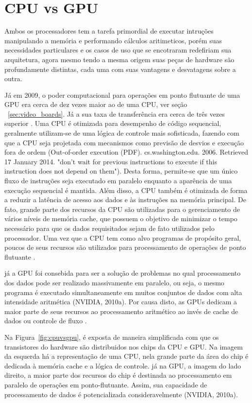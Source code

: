 \section{CPU vs GPU}

Ambos os processadores tem a tarefa primordial de executar intruções manipulando a memória e performando cálculos aritimeticos, porém suas necessidades particulares e os casos de uso que se encotraram redefiriam sua arquitetura, agora mesmo tendo a mesma origem suas peças de hardware são profundamente distintas, cada uma com suas vantagens e desvatagens sobre a outra.

Já em 2009, o poder computacional para operações em ponto flutuante de uma GPU era cerca de dez vezes maior ao de uma CPU, ver seção ~\ref{sec:video_boards}. Já a sua taxa de transferência era cerca de três vezes superior \citep{massively:16}. Uma CPU é otimizada para desempenho de código sequencial, geralmente utilizam-se de uma lógica de controle mais sofisticada, fazendo com que a CPU seja projetada com mecanismos como previsão de desvios e execução fora de ordem (Out-of-order execution (PDF). cs.washington.edu. 2006. Retrieved 17 January 2014. "don't wait for previous instructions to execute if this instruction does not depend on them"). Desta forma, permite-se que um único fluxo de instruções seja executado em paralelo enquanto a aparência de uma execução sequencial é mantida. Além disso, a CPU também é otimizada de forma a reduzir a latência de acesso aos dados e às instruções na memória principal. De fato, grande parte dos recursos da CPU são utilizadas para o gerenciamento de vários níveis de memória cache, que possuem o objetivo de minimizar o tempo necessário para que os dados requisitados sejam de fato utilizados pelo processador. Uma vez que a CPU tem como alvo programas de propósito geral, poucos de seus recursos são utilizados para processamento de operações de ponto flutuante \citep{massively:16}.

já a GPU foi consebida para ser a solução de problemas no qual processamento dos dados pode ser realizado massivamente em paralelo, ou seja, o mesmo programa é executado simultaneamente em muitos conjuntos de dados com alta intensidade aritmética (NVIDIA, 2010a). Por causa disto, as GPUs dedicam a maior parte de seus recursos ao processamento aritmético ao invés de cache de dados ou controle de fluxo \citep{massively:16}.

Na Figura~\ref{fig:cpuvsgpu}, é exposta de maneira simplificada com que os transistores do hardware são distribuidos nos chips da CPU e GPU. Na imagem da esquerda há a representação de uma CPU, nela grande parte da área do chip é dedicada à memória cache e a lógica de controle. já na GPU, a imagem do lado direito, a maior parte dos recursos do chip é destinada ao processamento em paralelo de operações em ponto-flutuante. Assim, sua capacidade de processamento de dados é potencializada consideravelmente (NVIDIA, 2010a).

